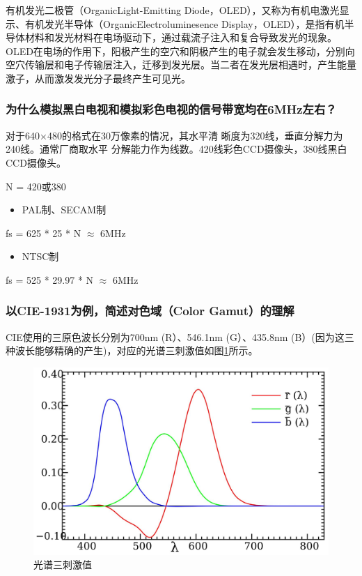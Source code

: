\documentclass[UTF8,a4paper,AutoFakeBold,AutoFakeSlant]{ctexart}
\begin{document}
有机发光二极管（OrganicLight-Emitting Diode，OLED），又称为有机电激光显示、有机发光半导体（OrganicElectroluminesence Display，OLED），是指有机半导体材料和发光材料在电场驱动下，通过载流子注入和复合导致发光的现象。
OLED在电场的作用下，阳极产生的空穴和阴极产生的电子就会发生移动，分别向空穴传输层和电子传输层注入，迁移到发光层。当二者在发光层相遇时，产生能量激子，从而激发发光分子最终产生可见光。



\subsubsection{为什么模拟黑白电视和模拟彩色电视的信号带宽均在6MHz左右？}
对于640×480的格式在30万像素的情况，其水平清
晰度为320线，垂直分解力为240线。通常厂商取水平
分解能力作为线数。420线彩色CCD摄像头，380线黑白CCD摄像头。

N = 420或380
\begin{itemize}
  \item PAL制、SECAM制
\end{itemize}

fs = 625 * 25 * N $\approx $ 6MHz

\begin{itemize}
  \item NTSC制
\end{itemize}

fs = 525 * 29.97 * N $\approx $ 6MHz



\subsubsection{以CIE-1931为例，简述对色域（Color Gamut）的理解}

CIE使用的三原色波长分别为700nm (R）、546.1nm (G）、435.8nm (B）(因为这三种波长能够精确的产生)，对应的光谱三刺激值如图\ref{f:光谱三刺激值}所示。

\begin{figure}[H]
  \centering
  \includegraphics[scale=0.2]{color.jpg}
  \caption{光谱三刺激值}
  \label{f:光谱三刺激值}
\end{figure}
\end{document}
